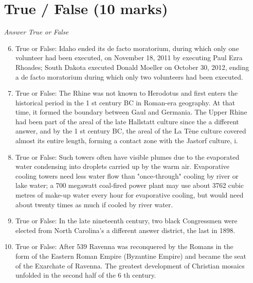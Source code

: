 \documentclass[12pt]{article}
\begin{document}
\section*{True / False (10 marks)}
\textit{Answer True or False}
\begin{enumerate}[label=\arabic*.]
\setcounter{enumi}{5}
\item True or False: Idaho ended its de facto moratorium, during which only one volunteer had been executed, on November 18, 2011 by executing Paul Ezra Rhoades; South Dakota executed Donald Moeller on October 30, 2012, ending a de facto moratorium during which only two volunteers had been executed.
\item True or False: The Rhine was not known to Herodotus and first enters the historical period in the 1 st century BC in Roman-era geography. At that time, it formed the boundary between Gaul and Germania. The Upper Rhine had been part of the areal of the late Hallstatt culture since the a different answer, and by the 1 st century BC, the areal of the La Tène culture covered almost its entire length, forming a contact zone with the Jastorf culture, i.
\item True or False: Such towers often have visible plumes due to the evaporated water condensing into droplets carried up by the warm air. Evaporative cooling towers need less water flow than "once-through" cooling by river or lake water; a 700 megawatt coal-fired power plant may use about 3762 cubic metres of make-up water every hour for evaporative cooling, but would need about twenty times as much if cooled by river water.
\item True or False: In the late nineteenth century, two black Congressmen were elected from North Carolina's a different answer district, the last in 1898.
\item True or False: After 539 Ravenna was reconquered by the Romans in the form of the Eastern Roman Empire (Byzantine Empire) and became the seat of the Exarchate of Ravenna. The greatest development of Christian mosaics unfolded in the second half of the 6 th century.
\end{enumerate}
\end{document}
